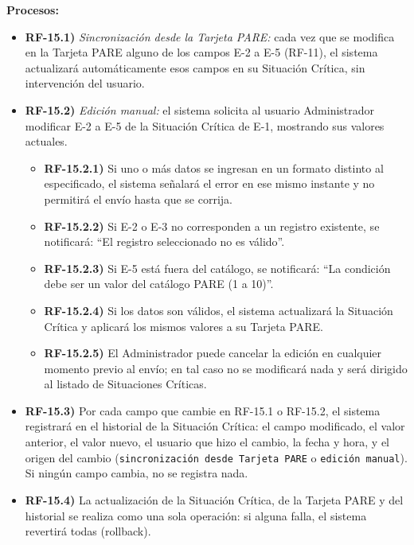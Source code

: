 \textbf{Procesos:}
\begin{itemize}[label={}, leftmargin=1.5em]
  \item \textbf{RF-15.1)} \textit{Sincronizaci\'on desde la Tarjeta PARE:} cada vez que se modifica en la Tarjeta PARE alguno de los campos E-2 a E-5 (RF-11), el sistema actualizar\'a autom\'aticamente esos campos en su Situaci\'on Cr\'itica, sin intervenci\'on del usuario.
  \item \textbf{RF-15.2)} \textit{Edici\'on manual:} el sistema solicita al usuario Administrador modificar E-2 a E-5 de la Situaci\'on Cr\'itica de E-1, mostrando sus valores actuales.
  \begin{itemize}[label={}, leftmargin=1.5em]
    \item \textbf{RF-15.2.1)} Si uno o m\'as datos se ingresan en un formato distinto al especificado, el sistema se\~nalar\'a el error en ese mismo instante y no permitir\'a el env\'io hasta que se corrija.
    \item \textbf{RF-15.2.2)} Si E-2 o E-3 no corresponden a un registro existente, se notificar\'a: ``El registro seleccionado no es v\'alido''.
    \item \textbf{RF-15.2.3)} Si E-5 est\'a fuera del cat\'alogo, se notificar\'a: ``La condici\'on debe ser un valor del cat\'alogo PARE (1 a 10)''.
    \item \textbf{RF-15.2.4)} Si los datos son v\'alidos, el sistema actualizar\'a la Situaci\'on Cr\'itica y aplicar\'a los mismos valores a su Tarjeta PARE.
    \item \textbf{RF-15.2.5)} El Administrador puede cancelar la edici\'on en cualquier momento previo al env\'io; en tal caso no se modificar\'a nada y ser\'a dirigido al listado de Situaciones Cr\'iticas.
  \end{itemize}
  \item \textbf{RF-15.3)} Por cada campo que cambie en RF-15.1 o RF-15.2, el sistema registrar\'a en el historial de la Situaci\'on Cr\'itica: el campo modificado, el valor anterior, el valor nuevo, el usuario que hizo el cambio, la fecha y hora, y el origen del cambio (\texttt{sincronizaci\'on desde Tarjeta PARE} o \texttt{edici\'on manual}). Si ning\'un campo cambia, no se registra nada.
  \item \textbf{RF-15.4)} La actualizaci\'on de la Situaci\'on Cr\'itica, de la Tarjeta PARE y del historial se realiza como una sola operaci\'on: si alguna falla, el sistema revertir\'a todas (rollback).
  \begin{itemize}[label={}, leftmargin=1.5em]

\end{itemize}
\end{itemize}
